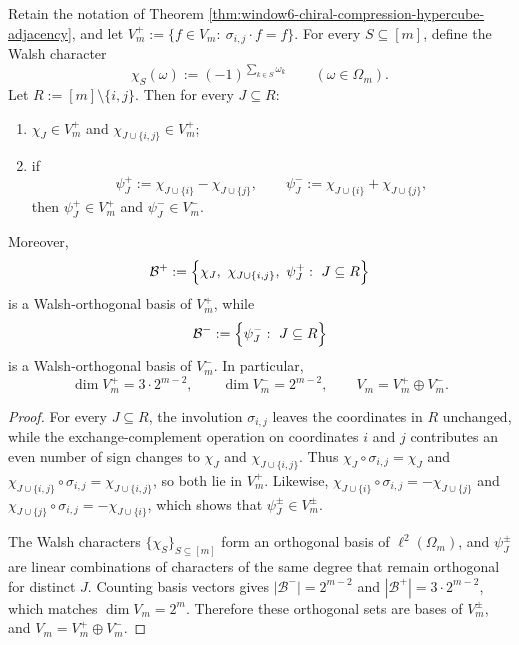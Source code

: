 \begin{theorem}\label{thm:window6-affine-chiral-walsh-decomposition}
Retain the notation of Theorem \ref{thm:window6-chiral-compression-hypercube-adjacency}, and let
\(
V_m^+:=\{f\in V_m:\ \sigma_{i,j}\cdot f=f\}
\).
For every \(S\subseteq[m]\), define the Walsh character
\[
\chi_S(\omega):=(-1)^{\sum_{k\in S}\omega_k}\qquad(\omega\in\Omega_m).
\]
Let \(R:=[m]\setminus\{i,j\}\).
Then for every \(J\subseteq R\):
\begin{enumerate}
  \item \(\chi_J\in V_m^+\) and \(\chi_{J\cup\{i,j\}}\in V_m^+\);
  \item if
  \[
  \psi_J^+:=\chi_{J\cup\{i\}}-\chi_{J\cup\{j\}},
  \qquad
  \psi_J^-:=\chi_{J\cup\{i\}}+\chi_{J\cup\{j\}},
  \]
  then \(\psi_J^+\in V_m^+\) and \(\psi_J^-\in V_m^-\).
\end{enumerate}
Moreover,
\[
\mathcal B^+:=\Bigl\{\chi_J,\ \chi_{J\cup\{i,j\}},\ \psi_J^+: \ J\subseteq R\Bigr\}
\]
is a Walsh-orthogonal basis of \(V_m^+\), while
\[
\mathcal B^-:=\Bigl\{\psi_J^-: \ J\subseteq R\Bigr\}
\]
is a Walsh-orthogonal basis of \(V_m^-\).
In particular,
\[
\dim V_m^+=3\cdot 2^{m-2},
\qquad
\dim V_m^-=2^{m-2},
\qquad
V_m=V_m^+\oplus V_m^-.
\]
\end{theorem}
\begin{proof}
For every \(J\subseteq R\), the involution \(\sigma_{i,j}\) leaves the coordinates in \(R\) unchanged, while the exchange-complement operation on coordinates \(i\) and \(j\) contributes an even number of sign changes to \(\chi_J\) and \(\chi_{J\cup\{i,j\}}\).
Thus
\(
\chi_J\circ\sigma_{i,j}=\chi_J
\)
and
\(
\chi_{J\cup\{i,j\}}\circ\sigma_{i,j}=\chi_{J\cup\{i,j\}}
\),
so both lie in \(V_m^+\).
Likewise,
\(
\chi_{J\cup\{i\}}\circ\sigma_{i,j}=-\chi_{J\cup\{j\}}
\)
and
\(
\chi_{J\cup\{j\}}\circ\sigma_{i,j}=-\chi_{J\cup\{i\}}
\),
which shows that \(\psi_J^\pm\in V_m^\pm\).
\par
The Walsh characters \(\{\chi_S\}_{S\subseteq[m]}\) form an orthogonal basis of \(\ell^2(\Omega_m)\), and \(\psi_J^\pm\) are linear combinations of characters of the same degree that remain orthogonal for distinct \(J\).
Counting basis vectors gives \(|\mathcal B^-|=2^{m-2}\) and \(|\mathcal B^+|=3\cdot 2^{m-2}\), which matches \(\dim V_m=2^m\).
Therefore these orthogonal sets are bases of \(V_m^\pm\), and \(V_m=V_m^+\oplus V_m^-\). \qedhere
\end{proof}

